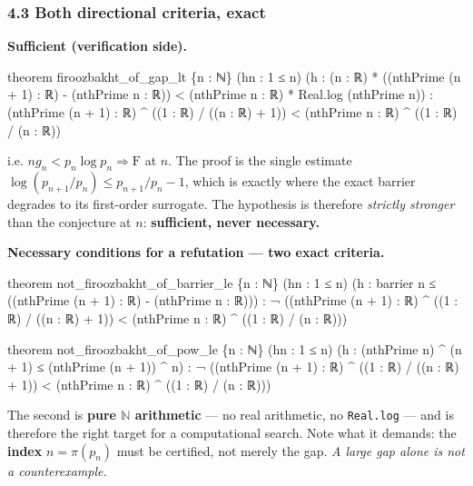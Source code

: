 \documentclass[
  a4paper,
  11pt]{article}
\newenvironment{Shaded}{}{}
\newcommand{\NormalTok}[1]{#1}
\begin{document}
\subsubsection{4.3 Both directional criteria,
exact}\label{43-both-directional-criteria-exact}

\textbf{Sufficient (verification side).}

\begin{Shaded}
\begin{Highlighting}[]
\NormalTok{theorem firoozbakht\_of\_gap\_lt \{n : ℕ\} (hn : 1 ≤ n)}
\NormalTok{    (h : (n : ℝ) * ((nthPrime (n + 1) : ℝ) {-} (nthPrime n : ℝ))}
\NormalTok{        \textless{} (nthPrime n : ℝ) * Real.log (nthPrime n)) :}
\NormalTok{    (nthPrime (n + 1) : ℝ) \^{} ((1 : ℝ) / ((n : ℝ) + 1)) \textless{}}
\NormalTok{      (nthPrime n : ℝ) \^{} ((1 : ℝ) / (n : ℝ))}
\end{Highlighting}
\end{Shaded}

i.e. \(n g_n < p_n \log p_n \Rightarrow \mathrm{F}\) at \(n\). The proof
is the single estimate \(\log(p_{n+1}/p_n) \le p_{n+1}/p_n - 1\), which
is exactly where the exact barrier degrades to its first-order
surrogate. The hypothesis is therefore \emph{strictly stronger} than the
conjecture at \(n\): \textbf{sufficient, never necessary.}

\textbf{Necessary conditions for a refutation --- two exact criteria.}

\begin{Shaded}
\begin{Highlighting}[]
\NormalTok{theorem not\_firoozbakht\_of\_barrier\_le \{n : ℕ\} (hn : 1 ≤ n)}
\NormalTok{    (h : barrier n ≤ ((nthPrime (n + 1) : ℝ) {-} (nthPrime n : ℝ))) :}
\NormalTok{    ¬ ((nthPrime (n + 1) : ℝ) \^{} ((1 : ℝ) / ((n : ℝ) + 1)) \textless{}}
\NormalTok{        (nthPrime n : ℝ) \^{} ((1 : ℝ) / (n : ℝ)))}

\NormalTok{theorem not\_firoozbakht\_of\_pow\_le \{n : ℕ\} (hn : 1 ≤ n)}
\NormalTok{    (h : (nthPrime n) \^{} (n + 1) ≤ (nthPrime (n + 1)) \^{} n) :}
\NormalTok{    ¬ ((nthPrime (n + 1) : ℝ) \^{} ((1 : ℝ) / ((n : ℝ) + 1)) \textless{}}
\NormalTok{        (nthPrime n : ℝ) \^{} ((1 : ℝ) / (n : ℝ)))}
\end{Highlighting}
\end{Shaded}

The second is \textbf{pure \(\mathbb{N}\) arithmetic} --- no real
arithmetic, no \texttt{Real.log} --- and is therefore the right target
for a computational search. Note what it demands: the \textbf{index}
\(n = \pi(p_n)\) must be certified, not merely the gap. \emph{A large
gap alone is not a counterexample.}
\end{document}
